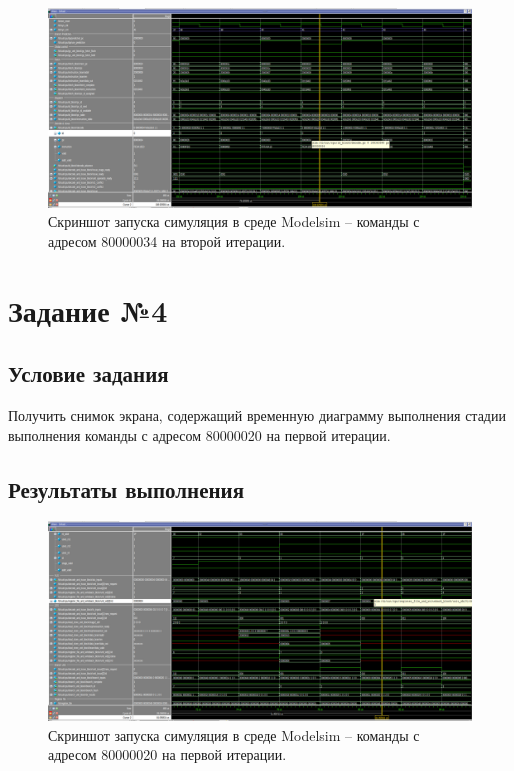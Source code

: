 \begin{figure}[h]
	\centering
	\includegraphics[height=0.35\textheight]{img/3}
	\caption{Скриншот запуска симуляция в среде Modelsim -- команды с адресом 80000034 на второй итерации.}
	\label{img:3}
\end{figure}

\section{Задание №4}

\subsection*{Условие задания}
Получить снимок экрана, содержащий временную диаграмму выполнения стадии выполнения команды с адресом 80000020 на первой итерации.

\subsection*{Результаты выполнения}

\begin{figure}[h]
	\centering
	\includegraphics[height=0.35\textheight]{img/4}
	\caption{Скриншот запуска симуляция в среде Modelsim -- команды с адресом 80000020 на первой итерации.}
	\label{img:4}
\end{figure}

